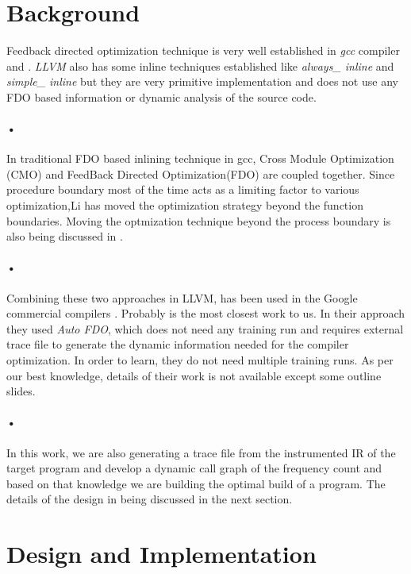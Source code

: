 \documentclass{sigplanconf}
\begin{document}
\section{Background}
Feedback directed optimization technique is very well established in \emph{gcc} compiler \cite{Li} and \cite{lipo} . \emph{LLVM} also has some inline techniques established like \textit{always\_ inline} and \textit{simple\_ inline} but they are very primitive implementation and does not use any FDO based information or dynamic analysis of the source code.
\paragraph*{•} In traditional FDO based inlining technique in gcc, Cross Module Optimization (CMO) and FeedBack Directed Optimization(FDO) are coupled together. Since procedure boundary most of the time acts as a limiting factor to various optimization,Li\cite{Li} has moved the optimization strategy beyond the function boundaries. Moving the optmization technique beyond the process boundary is also being discussed in \citep{Triant}.
\paragraph*{•} Combining these two approaches in LLVM, has been used in the Google commercial compilers \cite{diego}. Probably \cite{diego} is the most closest work to us.  In their approach they used \emph{Auto FDO}, which does not need any training run and requires external trace file to generate the dynamic information needed for the compiler optimization. In order to learn, they do not need multiple training runs. As per our best knowledge, details of their work is not available except some outline slides.
\paragraph*{•} In this work, we are also generating a trace file from the instrumented IR of the target program and develop a dynamic call graph of the frequency count and based on that knowledge we are building the optimal build of a program. The details of the design in being discussed in the next section.

\section{Design and Implementation}
\end{document}
